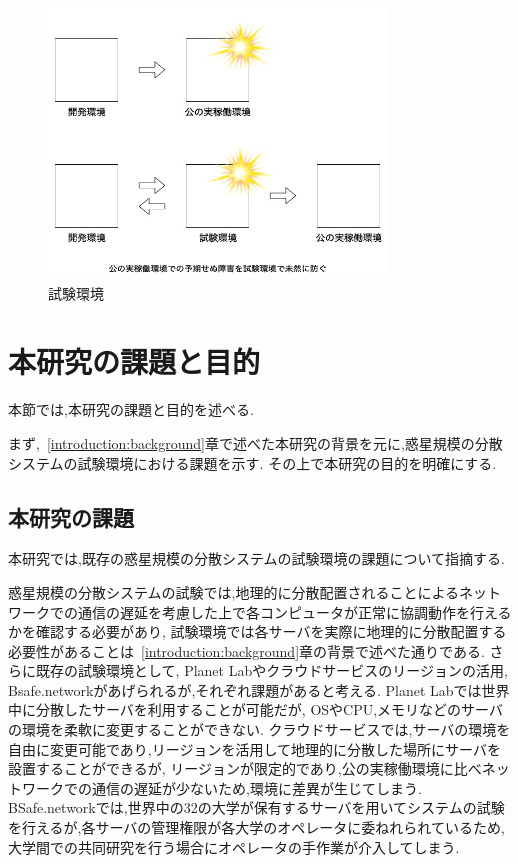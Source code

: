 \begin{figure}[htbp]
  \begin{center}
    \includegraphics[width=0.8\textwidth]{./figures/staging.jpg}
    \caption{試験環境}
  \end{center}
\end{figure}

\section{本研究の課題と目的}
\label{introduction:issue-aim}

本節では,本研究の課題と目的を述べる.

まず,~\ref{introduction:background}章で述べた本研究の背景を元に,惑星規模の分散システムの試験環境における課題を示す.
その上で本研究の目的を明確にする.

\subsection{本研究の課題}
\label{introduction:issue-aim:issue}

本研究では,既存の惑星規模の分散システムの試験環境の課題について指摘する.

惑星規模の分散システムの試験では,地理的に分散配置されることによるネットワークでの通信の遅延を考慮した上で各コンピュータが正常に協調動作を行えるかを確認する必要があり,
試験環境では各サーバを実際に地理的に分散配置する必要性があることは~\ref{introduction:background}章の背景で述べた通りである.
さらに既存の試験環境として, Planet Labやクラウドサービスのリージョンの活用, Bsafe.networkがあげられるが,それぞれ課題があると考える.
Planet Labでは世界中に分散したサーバを利用することが可能だが, OSやCPU,メモリなどのサーバの環境を柔軟に変更することができない.
クラウドサービスでは,サーバの環境を自由に変更可能であり,リージョンを活用して地理的に分散した場所にサーバを設置することができるが,
リージョンが限定的であり,公の実稼働環境に比べネットワークでの通信の遅延が少ないため,環境に差異が生じてしまう.
BSafe.networkでは,世界中の32の大学が保有するサーバを用いてシステムの試験を行えるが,各サーバの管理権限が各大学のオペレータに委ねれられているため,
大学間での共同研究を行う場合にオペレータの手作業が介入してしまう.

